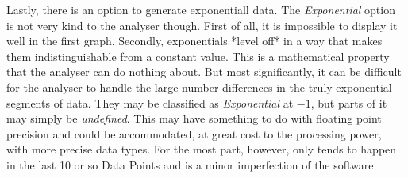 \documentclass[main.tex]{subfiles}
\begin{document}
      Lastly, there is an option to generate exponentiall data. The \textit{Exponential} option is not very kind to the analyser though. First of all, it is impossible to display it well in the first graph. Secondly, exponentials *level off* in a way that makes them indistinguishable from a constant value. This is a mathematical property that the analyser can do nothing about. But most significantly, it can be difficult for the analyser to handle the large number differences in the truly exponential segments of data. They may be classified as \textit{Exponential} at $-1$, but parts of it may simply be \textit{undefined}. This may have something to do with floating point precision and could be accommodated, at great cost to the processing power, with more precise data types. For the most part, however, only tends to happen in the last 10 or so Data Points and is a minor imperfection of the software.    
    
\end{document}
